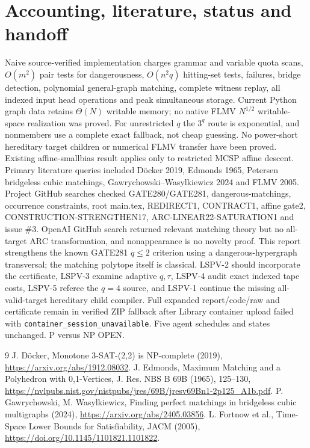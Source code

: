 \documentclass[11pt]{article}
\begin{document}
\section{Accounting, literature, status and handoff}
Naive source-verified implementation charges grammar and variable quota scans, $O(m^2)$ pair tests for dangerousness, $O(n^2q)$ hitting-set tests, failures, bridge detection, polynomial general-graph matching, complete witness replay, all indexed input head operations and peak simultaneous storage. Current Python graph data retains $\Theta(N)$ writable memory; no native FLMV $N^{1/2}$ writable-space realization was proved. For unrestricted $q$ the $3^q$ route is exponential, and nonmembers use a complete exact fallback, not cheap guessing. No power-short hereditary target children or numerical FLMV transfer have been proved. Existing affine-smallbias result applies only to restricted MCSP affine descent.
Primary literature queries included D\"ocker 2019, Edmonds 1965, Petersen bridgeless cubic matchings, Gawrychowski--Wasylkiewicz 2024 and FLMV 2005. Project GitHub searches checked GATE280/GATE281, dangerous-matchings, occurrence constraints, root main.tex, REDIRECT1, CONTRACT1, affine gate2, CONSTRUCTION-STRENGTHEN17, ARC-LINEAR22-SATURATION1 and issue \#3. OpenAI GitHub search returned relevant matching theory but no all-target ARC transformation, and nonappearance is no novelty proof. This report strengthens the known GATE281 $q\le2$ criterion using a dangerous-hypergraph transversal; the matching polytope itself is classical. LSPV-2 should incorporate the certificate, LSPV-3 examine adaptive $q,\tau$, LSPV-4 audit exact indexed tape costs, LSPV-5 referee the $q=4$ source, and LSPV-1 continue the missing all-valid-target hereditary child compiler. Full expanded report/code/raw and certificate remain in verified ZIP fallback after Library container upload failed with \texttt{container\_session\_unavailable}. Five agent schedules and states unchanged. P versus NP OPEN.
\begin{thebibliography}{9}
 J. D\"ocker, Monotone 3-SAT-(2,2) is NP-complete (2019), \url{https://arxiv.org/abs/1912.08032}.
 J. Edmonds, Maximum Matching and a Polyhedron with 0,1-Vertices, J. Res. NBS B 69B (1965), 125--130, \url{https://nvlpubs.nist.gov/nistpubs/jres/69B/jresv69Bn1-2p125_A1b.pdf}.
 P. Gawrychowski, M. Wasylkiewicz, Finding perfect matchings in bridgeless cubic multigraphs (2024), \url{https://arxiv.org/abs/2405.03856}.
 L. Fortnow et al., Time-Space Lower Bounds for Satisfiability, JACM (2005), \url{https://doi.org/10.1145/1101821.1101822}.
\end{thebibliography}
\end{document}
